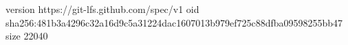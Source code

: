 version https://git-lfs.github.com/spec/v1
oid sha256:481b3a4296c32a16d9c5a31224dac1607013b979ef725c88dfba09598255bb47
size 22040
